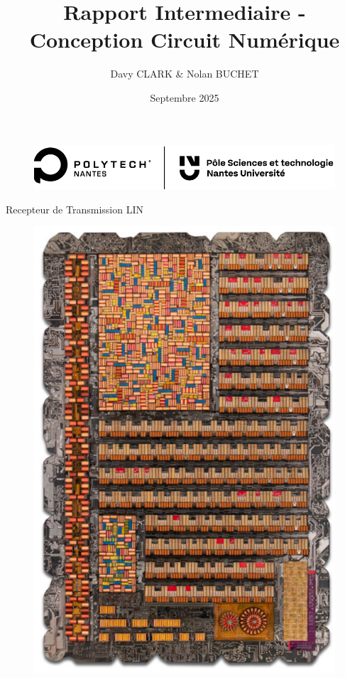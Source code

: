 \documentclass{article}
\title{Rapport Intermediaire - Conception Circuit Numérique}
\author{Davy CLARK \& Nolan BUCHET}
\date{Septembre 2025}
\begin{document}
\maketitle

\begin{figure}[H]
    \centering
    \includegraphics[width=1\linewidth]{Graphix/Polytech_Univ.png}
\end{figure}

\vspace{10pt}

\begin{center}
        {\Huge Recepteur de Transmission LIN}
\end{center}

\vspace{10pt}

\begin{figure}[H]
    \centering
    \includegraphics[width=0.4\linewidth]{Image_Base.png}
\end{figure}

\thispagestyle{empty} 


\tableofcontents

























\listoffigures
\end{document}
